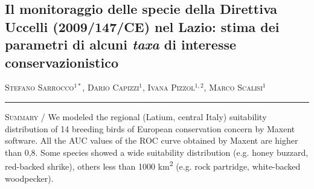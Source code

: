 \setcounter{figure}{0}
\setcounter{table}{0}

\begin{adjustwidth}{-3.5cm}{0cm}
\pagestyle{CIOpage}
\chapter*[Il monitoraggio delle specie della Direttiva Uccelli nel
Lazio]{\textbf{Il monitoraggio delle specie della Direttiva Uccelli
(2009/147/CE) nel Lazio: stima dei parametri di alcuni
}\textbf{\textit{taxa}}\textbf{ di interesse conservazionistico}}

\textsc{Stefano Sarrocco}$^{1*}$, \textsc{Dario Capizzi}$^1$, \textsc{Ivana Pizzol}$^{1,2}$, 
\textsc{Marco Scalisi}$^1$  \\

   
\noindent\color{MUSEBLUE}\rule{27cm}{2pt}
\vspace{1cm}
\end{adjustwidth}


{\small
\noindent \textsc{\color{MUSEBLUE} Summary} / We modeled the regional (Latium, central Italy) suitability distribution
of 14 breeding birds of European conservation concern by Maxent
software. All the AUC values of the ROC curve obtained by Maxent are
higher than 0,8. Some species showed a wide suitability distribution
(e.g. honey buzzard, red-backed shrike), others less than 1000
km\textsuperscript{2} (e.g. rock partridge, white-backed woodpecker).\\
}

